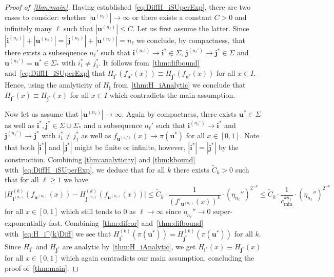 \documentclass[11pt,a4paper]{article}
\def\cref#1{\ref{#1}}%
\theoremstyle{definition}
\theoremstyle{remark}
\newcommand{\0}{\mathbf{0}}
\newcommand{\bi}{\mathbf{i}}
\newcommand{\bj}{\mathbf{j}}
\newcommand{\bu}{\mathbf{u}}
\numberwithin{equation}{section}
\begin{document}
\begin{proof}[Proof of~\cref{thm:main}]
Having established~\cref{eq:DiffH_iSUperExp}, there are two cases to consider: whether
$|\bu^{(n_\ell)}| \to \infty$ or there exists a constant $C>0$ and infinitely many $\ell$ such that
$|\bu^{(n_\ell)}| \leq C$. Let us first assume the latter. Since $|\bi^{(n_\ell)}|+ |\bu^{(n_\ell)}|
= |\bj^{(n_\ell)}|+|\bu^{(n_\ell)}| = n_\ell$ we conclude, by compactness, that
there exists a subsequence $n_\ell'$ such that $\bi^{(n_\ell')} \to \bi^*\in\Sigma$,
$\bj^{(n_\ell')}\to\bj^*\in\Sigma$ and $\bu^{(n_\ell')}=\bu^*\in\Sigma_*$ with $i_1^*\neq j_1^*$.
It follows from~\cref{thm:difbound} and~\cref{eq:DiffH_iSUperExp} that
$
  H_{\bi^*}(f_{\bu^*}(x))\equiv H_{\bj^*}(f_{\bu^*}(x))
$
for all $x\in I$.  Hence, using the analyticity of $H_{\bi}$ from~\cref{thm:H_iAnalytic} we conclude
that $H_{\bi^*}(x) \equiv H_{\bj^*}(x)$ for all $x\in I$ which contradicts the main assumption.

Now let us assume that $|\bu^{(n_\ell)}| \to \infty$. Again by compactness, there exists
$\bu^*\in\Sigma$ as well as $\bi^*,\bj^*\in\Sigma\cup\Sigma_*$  and a
subsequence $n_\ell'$ such that $\bi^{(n_\ell')}\to \bi^*$ and $\bj^{(n_\ell')}\to \bj^*$ with
$i_1^*\neq j_1^*$ as well as $f_{\bu^{(n_\ell')}}(x) \to \pi(\bu^*)$ for all $x\in[0,1]$. Note that
both $|\bi^*|$ and
$|\bj^*|$ might be finite or infinite, however, $|\bi^*|=|\bj^*|$ by the construction. Combining
\cref{thm:analyticity} and \cref{thm:kbound} with~\cref{eq:DiffH_iSUperExp}, we deduce that for all
$k$ there
exists $\widetilde{C}_k>0$ such that for all $\ell\geq 1$ we have
\begin{equation}\label{eq:H_i^(k)Diff}
  \big|H_{\bi^{(n_\ell)}}^{(k)}(f_{\bu^{(n_\ell)}}(x)) - H_{\bj^{(n_\ell)}}^{(k)}(f_{\bu^{(n_\ell)}}(x))\big|
  \leq \widetilde{C}_k \cdot
  \frac{1}{(f'_{\bu^{(n_\ell)}}(x))^k}\cdot\left(\eta_{n_\ell}''\right)^{2^{-k}}\leq\widetilde{C}_k
  \cdot \frac{1}{c_{\min}^{k n_\ell}}\cdot\left(\eta_{n_\ell}''\right)^{2^{-k}}
\end{equation}
for all $x\in[0,1]$ which still tends to $0$ as $\ell\to\infty$ since $\eta_{n_{\ell}}''\to 0$
super-exponentially fast. Combining~\cref{thm:difcor} and~\cref{thm:difbound}
with~\cref{eq:H_i^(k)Diff} we see that $H_{\bi^*}^{(k)}(\pi(\bu^*))=H_{\bj^*}^{(k)}(\pi(\bu^*))$ for
all $k$.
Since $H_{\bi^*}$ and $H_{\bj^*}$ are analytic by~\cref{thm:H_iAnalytic}, we get 
$H_{\bi^*}(x)\equiv H_{\bj^*}(x)$ for all
$x\in[0,1]$ which again contradicts our main assumption, concluding the proof of~\cref{thm:main}. 
\end{proof}
\end{document}

